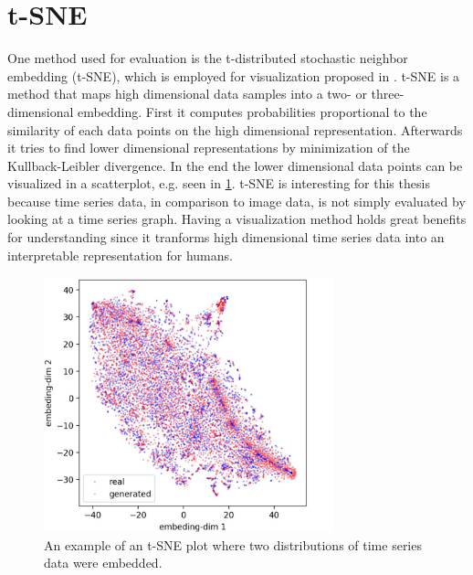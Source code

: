 \section{t-SNE}
\label{sec:tsne}
One method used for evaluation is the t-distributed stochastic neighbor embedding (t-SNE), which is employed for visualization proposed in \cite{maaten2008tsne}.
t-SNE is a method that maps high dimensional data samples into a two- or three-dimensional embedding. First it computes probabilities proportional to the similarity of each data points on the high dimensional representation. Afterwards it tries to find lower dimensional representations by minimization of the Kullback-Leibler divergence.\newline
In the end the lower dimensional data points can be visualized in a scatterplot, e.g. seen in \ref{fig:tsne example}.
t-SNE is interesting for this thesis because time series data, in comparison to image data, is not simply evaluated by looking at a time series graph. Having a visualization method holds great benefits for understanding since it tranforms high dimensional time series data into an interpretable representation for humans.
\begin{figure}[h!]
    \centering
    \includegraphics[width=0.75\textwidth]{images/tsne example.JPG}
    \caption{An example of an t-SNE plot where two distributions of time series data were embedded.}
    \label{fig:tsne example}
\end{figure}
\newpage
